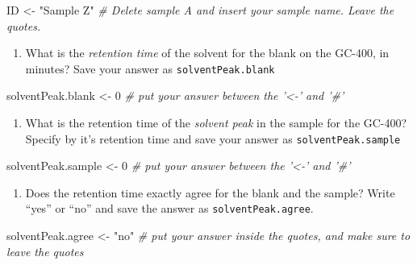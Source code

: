 \documentclass[]{tufte-book}
\newenvironment{Shaded}{}{}
\newcommand{\CommentTok}[1]{\textcolor[rgb]{0.38,0.63,0.69}{\textit{#1}}}
\newcommand{\DecValTok}[1]{\textcolor[rgb]{0.25,0.63,0.44}{#1}}
\newcommand{\NormalTok}[1]{#1}
\newcommand{\StringTok}[1]{\textcolor[rgb]{0.25,0.44,0.63}{#1}}
\providecommand{\tightlist}{%
  \setlength{\itemsep}{0pt}\setlength{\parskip}{0pt}}
\begin{document}
\begin{Shaded}
\begin{Highlighting}[]
\NormalTok{ID <-}\StringTok{ "Sample Z"}  \CommentTok{# Delete sample A and insert your sample name.  Leave the quotes.}
\end{Highlighting}
\end{Shaded}

\begin{enumerate}
\def\labelenumi{\arabic{enumi}.}
\setcounter{enumi}{1}
\tightlist
\item
  What is the \emph{retention time} of the solvent for the blank on the GC-400, in minutes? Save your answer as \texttt{solventPeak.blank}
\end{enumerate}

\begin{Shaded}
\begin{Highlighting}[]
\NormalTok{solventPeak.blank <-}\StringTok{ }\DecValTok{0}    \CommentTok{# put your answer between the '<-' and '#'}
\end{Highlighting}
\end{Shaded}

\begin{enumerate}
\def\labelenumi{\arabic{enumi}.}
\setcounter{enumi}{2}
\tightlist
\item
  What is the retention time of the \emph{solvent peak} in the sample for the GC-400? Specify by it's retention time and save your answer as \texttt{solventPeak.sample}
\end{enumerate}

\begin{Shaded}
\begin{Highlighting}[]
\NormalTok{solventPeak.sample <-}\StringTok{ }\DecValTok{0}    \CommentTok{# put your answer between the '<-' and '#'}
\end{Highlighting}
\end{Shaded}

\begin{enumerate}
\def\labelenumi{\arabic{enumi}.}
\setcounter{enumi}{3}
\tightlist
\item
  Does the retention time exactly agree for the blank and the sample? Write ``yes'' or ``no'' and save the answer as \texttt{solventPeak.agree}.
\end{enumerate}

\begin{Shaded}
\begin{Highlighting}[]
\NormalTok{solventPeak.agree <-}\StringTok{ "no"}    \CommentTok{# put your answer inside the quotes, and make sure to leave the quotes}
\end{Highlighting}
\end{Shaded}
\end{document}
